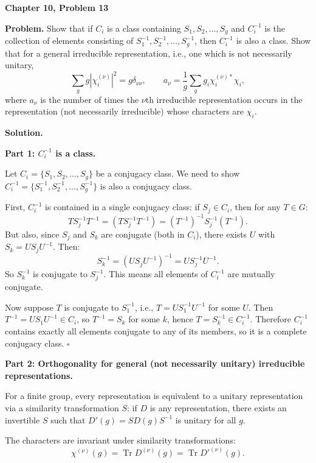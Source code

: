 \documentclass[12pt]{article}
\begin{document}
\begin{center}
{\Large\bfseries Chapter 10, Problem 13}
\end{center}

\noindent\textbf{Problem.} Show that if $C_i$ is a class containing $S_1, S_2, \ldots, S_g$ and $C_i^{-1}$ is the collection of elements consisting of $S_1^{-1}, S_2^{-1}, \ldots, S_g^{-1}$, then $C_i^{-1}$ is also a class. Show that for a general irreducible representation, i.e., one which is not necessarily unitary,
\[
\sum_g g|\chi_i^{(\nu)}|^2 = g\delta_{\nu\nu}, \qquad a_\nu = \frac{1}{g}\sum_g g_i\chi_i^{(\nu)*}\chi_i,
\]
where $a_\nu$ is the number of times the $\nu$th irreducible representation occurs in the representation (not necessarily irreducible) whose characters are $\chi_i$.

\bigskip
\noindent\textbf{Solution.}

\noindent\textbf{Part 1: $C_i^{-1}$ is a class.}

Let $C_i = \{S_1, S_2, \ldots, S_g\}$ be a conjugacy class. We need to show $C_i^{-1} = \{S_1^{-1}, S_2^{-1}, \ldots, S_g^{-1}\}$ is also a conjugacy class.

First, $C_i^{-1}$ is contained in a single conjugacy class: if $S_j \in C_i$, then for any $T \in G$:
\[
T S_j^{-1} T^{-1} = (T S_j^{-1} T^{-1}) = (T^{-1})^{-1} S_j^{-1} (T^{-1}) .
\]
But also, since $S_j$ and $S_k$ are conjugate (both in $C_i$), there exists $U$ with $S_k = U S_j U^{-1}$. Then:
\[
S_k^{-1} = (U S_j U^{-1})^{-1} = U S_j^{-1} U^{-1}.
\]
So $S_k^{-1}$ is conjugate to $S_j^{-1}$. This means all elements of $C_i^{-1}$ are mutually conjugate.

Now suppose $T$ is conjugate to $S_1^{-1}$, i.e., $T = U S_1^{-1} U^{-1}$ for some $U$. Then $T^{-1} = U S_1 U^{-1} \in C_i$, so $T^{-1} = S_k$ for some $k$, hence $T = S_k^{-1} \in C_i^{-1}$. Therefore $C_i^{-1}$ contains exactly all elements conjugate to any of its members, so it is a complete conjugacy class. $\square$

\medskip
\noindent\textbf{Part 2: Orthogonality for general (not necessarily unitary) irreducible representations.}

For a finite group, every representation is equivalent to a unitary representation via a similarity transformation $S$: if $D$ is any representation, there exists an invertible $S$ such that $D'(g) = S D(g) S^{-1}$ is unitary for all $g$.

The characters are invariant under similarity transformations:
\[
\chi^{(\nu)}(g) = \operatorname{Tr} D^{(\nu)}(g) = \operatorname{Tr} D'^{(\nu)}(g).
\]
\end{document}
